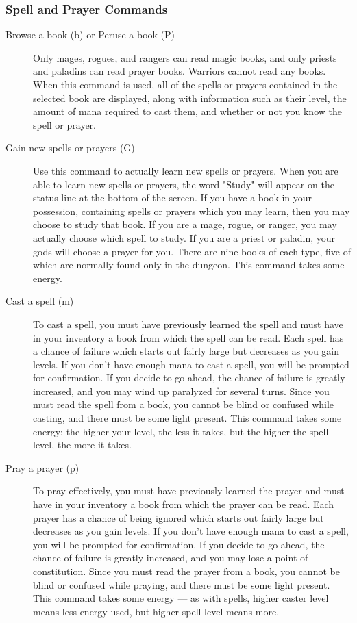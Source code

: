 \subsubsection{Spell and Prayer Commands}
\begin{description}
\item[Browse a book (b) or Peruse a book (P)]
  Only mages, rogues, and rangers can read magic books, and only priests
  and paladins can read prayer books. Warriors cannot read any books. When
  this command is used, all of the spells or prayers contained in the
  selected book are displayed, along with information such as their level,
  the amount of mana required to cast them, and whether or not you know
  the spell or prayer.

\item[Gain new spells or prayers (G)]
  Use this command to actually learn new spells or prayers. When you are
  able to learn new spells or prayers, the word "Study" will appear on the
  status line at the bottom of the screen.  If you have a book in your
  possession, containing spells or prayers which you may learn, then you
  may choose to study that book.  If you are a mage, rogue, or ranger, you
  may actually choose which spell to study.  If you are a priest or
  paladin, your gods will choose a prayer for you.  There are nine books
  of each type, five of which are normally found only in the dungeon. This
  command takes some energy.

\item[Cast a spell (m)]
  To cast a spell, you must have previously learned the spell and must
  have in your inventory a book from which the spell can be read. Each
  spell has a chance of failure which starts out fairly large but
  decreases as you gain levels. If you don't have enough mana to cast a
  spell, you will be prompted for confirmation. If you decide to go ahead,
  the chance of failure is greatly increased, and you may wind up
  paralyzed for several turns. Since you must read the spell from a book,
  you cannot be blind or confused while casting, and there must be some
  light present. This command takes some energy: the higher your level,
  the less it takes, but the higher the spell level, the more it takes.

\item[Pray a prayer (p)]
  To pray effectively, you must have previously learned the prayer and
  must have in your inventory a book from which the prayer can be
  read. Each prayer has a chance of being ignored which starts out fairly
  large but decreases as you gain levels.  If you don't have enough mana
  to cast a spell, you will be prompted for confirmation. If you decide to
  go ahead, the chance of failure is greatly increased, and you may lose a
  point of constitution.  Since you must read the prayer from a book, you
  cannot be blind or confused while praying, and there must be some light
  present.  This command takes some energy --- as with spells, higher caster
  level means less energy used, but higher spell level means more.
\end{description}

